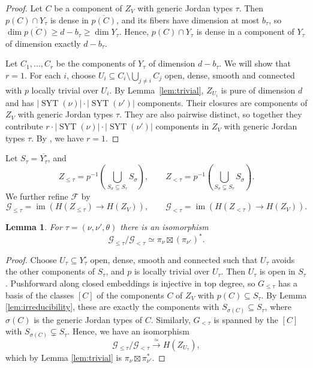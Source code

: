 \documentclass[12pt,a4paper]{article}
\theoremstyle{plain}
\newtheorem{lemma}[thm]{Lemma}
\theoremstyle{definition}
\theoremstyle{remark}
\newcommand{\SYT}{\operatorname{SYT}}
\newcommand{\im}{\operatorname{im}}
\newcommand{\cF}{\mathcal{F}}
\newcommand{\cG}{\mathcal{G}}
\begin{document}
    \begin{proof}
        Let $C$ be a component of $Z_V$ with generic Jordan types $\tau$. Then $p(C)\cap Y_\tau$ is
        dense in $\overline{p(C)}$, and its fibers have dimension at most $b_\tau$, so $\dim \overline{p(C)} \geq d-b_\tau \geq \dim Y_\tau$. Hence, $p(C)\cap Y_\tau$ is dense in a component of $Y_\tau$ of dimension exactly $d-b_\tau$.

       Let $C_1,\dots,C_r$ be the components of $Y_\tau$ of dimension $d-b_\tau$. We will show that $r = 1$. For each $i$, choose $U_i\subseteq C_i\setminus\bigcup_{j\ne i}C_j$ open, dense, smooth and connected with $p$ locally trivial over $U_i$. By Lemma~\ref{lem:trivial}, $Z_{U_i}$ is pure of dimension $d$ and has $|\SYT(\nu)|\cdot|\SYT(\nu')|$ components. Their closures are components of $Z_V$ with generic Jordan types $\tau$. They are also pairwise distinct, so together they contribute $r\cdot |\SYT(\nu)|\cdot |\SYT(\nu')|$ components in $Z_V$ with generic Jordan types $\tau$. By \cite[Proposition 1]{travkin2009mirabolic}, we have $r = 1$.
    \end{proof}
    
    Let $S_\tau=\overline{Y^\circ_\tau}$, and
    \[
    Z_{\leq \tau} = p^{-1}\left(\bigcup_{S_\sigma\subseteq S_\tau}S_\sigma\right),\qquad Z_{< \tau} = p^{-1}\left(\bigcup_{S_\sigma\subsetneq S_\tau}S_\sigma\right).
    \]
    We further refine $\cF$ by
    \[
    \cG_{\leq \tau} = \im\left(H(Z_{\leq \tau}) \rightarrow H(Z_V)\right), \qquad \cG_{< \tau} = \im\left(H(Z_{< \tau}) \rightarrow H(Z_V)\right).
    \]
    \begin{lemma}\label{lem:tau-filtration}
        For $\tau=(\nu,\nu',\theta)$ there is an isomorphism
        \[
        \cG_{\leq\tau}/\cG_{<\tau} \simeq \pi_\nu\boxtimes (\pi_{\nu'})^*.
        \]
    \end{lemma}

    \begin{proof}
        Choose $U_\tau\subseteq Y_\tau^\circ$ open, dense, smooth and connected such that $U_\tau$ avoids the other components of $S_\tau$, and $p$ is locally trivial over $U_\tau$. Then $U_\tau$ is open in $S_\tau$. Pushforward along closed embeddings is injective in top degree, so $G_{\leq\tau}$ has a basis of the classes $[C]$ of the components $C$ of $Z_V$ with $p(C)\subseteq S_\tau$. By Lemma \ref{lem:irreducibility}, these are exactly the components with $S_{\sigma(C)}\subseteq S_\tau$, where $\sigma(C)$ is the generic Jordan types of $C$. Similarly, $G_{<\tau}$ is spanned by the $[C]$ with $S_{\sigma(C)}\subsetneq S_\tau$. Hence, we have an isomorphism
        \[
        \cG_{\leq\tau} /\cG_{<\tau}\xrightarrow{\simeq} H(Z_{U_\tau}),
        \]
        which by Lemma \ref{lem:trivial} is $\pi_\nu\boxtimes\pi_{\nu'}^*$.
    \end{proof}
\end{document}
